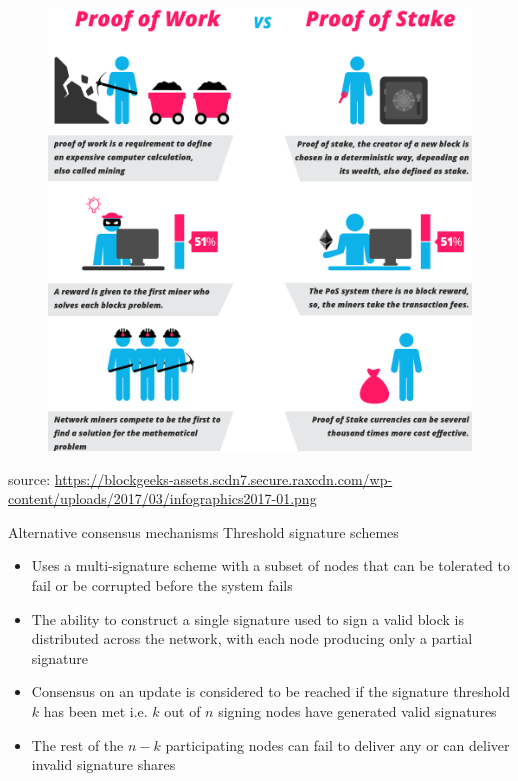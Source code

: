 \documentclass[10pt]{beamer}
\begin{document}
\begin{frame}
	\begin{figure}[]
		\centering
		\includegraphics  [scale=0.15]{Images/vs}
	\end{figure}
	\begin{scriptsize}
		source: \href{https://blockgeeks.com/guides/proof-of-work-vs-proof-of-stake/}{https://blockgeeks-assets.scdn7.secure.raxcdn.com/wp-content/uploads/2017/03/infographics2017-01.png}
	\end{scriptsize}
\end{frame}


\begin{frame}{Alternative consensus mechanisms}
	Threshold signature schemes
	\begin{itemize}
		\item Uses a multi-signature scheme with a subset of nodes that can be tolerated to fail or be corrupted before the system fails
		\item The ability to construct a single signature used to sign a valid block is distributed across the network, with each node producing only a partial signature
		\item Consensus on an update is considered to be reached if the signature threshold $k$ has been met i.e.  $k$ out of $n$ signing nodes have generated valid signatures
		\item The rest of the $n-k$ participating nodes can fail to deliver any or can deliver invalid signature shares
	\end{itemize}
\end{frame}
\end{document}
